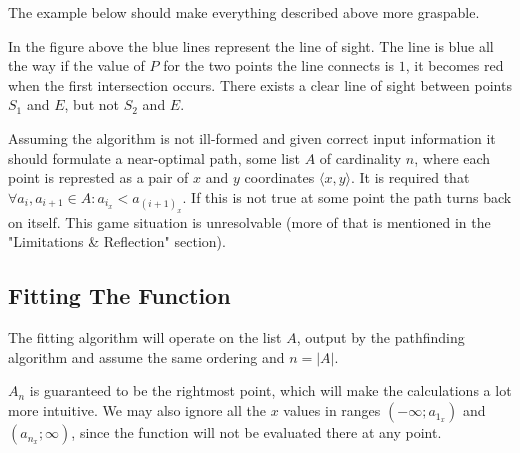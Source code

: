 \documentclass[12pt, titlepage]{article}
\begin{document}
The example below should make everything described above more graspable.

\begin{center}
    
In the figure above the blue lines represent the line of sight. The line
is blue all the way if the value of $P$ for the two points the line connects
is $1$, it becomes red when the first intersection occurs. There exists
a clear line of sight between points $S_1$ and $E$, but not $S_2$ and $E$.
\end{center}

Assuming the algorithm is not ill-formed and given correct input information
it should formulate a near-optimal path, some list $A$ of cardinality $n$, 
where each point is represted as  a pair of $x$ and $y$ coordinates 
$\langle x, y \rangle$. It is required that
$\forall a_i,a_{i+1} \in A : a_{i_x} < a_{{(i+1)}_x}$. If this is not true 
at some point the path turns back on itself. This game situation is unresolvable 
(more of that is mentioned in the "Limitations \& Reflection" section).

\subsection{Fitting The Function}

The fitting algorithm will operate on the list $A$, output by the 
pathfinding algorithm and assume the same ordering and $n = |A|$.

$A_n$ is guaranteed to be the rightmost point, which
will make the calculations a lot more intuitive.
We may also ignore all the $x$ values in ranges 
$(-\infty; a_{1_x})$ and $(a_{n_x}; \infty)$, since the function will not be 
evaluated there at any point.
\end{document}

